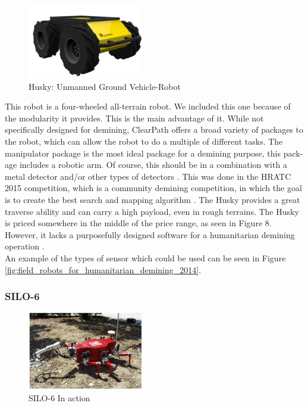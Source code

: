 \begin{figure}
    \centering
      \includegraphics[width=0.45\textwidth]{00 - Images/husky_unmanned_ground_vehicle_robot.png}
  \caption{Husky: Unmanned Ground Vehicle-Robot \cite{ClearPath2020}}
  \label{fig:husky_unmanned_ground_vehicle_robot}
\end{figure}
This robot is a four-wheeled all-terrain robot. We included this one because of the modularity it provides. This is the main advantage of it. While not specifically designed for demining, ClearPath offers a broad variety of packages to the robot, which can allow the robot to do a multiple of different tasks. The manipulator package is the most ideal package for a demining purpose, this pack-age includes a robotic arm. Of course, this should be in a combination with a metal detector and/or other types of detectors \cite{ClearPath2020}. This was done in the HRATC 2015 competition, which is a community demining competition, in which the goal is to create the best search and mapping algorithm \cite{HRATC2015}. The Husky provides a great traverse ability and can carry a high payload, even in rough terrains. The Husky is priced somewhere in the middle of the price range, as seen in Figure 8. However, it lacks a purposefully designed software for a humanitarian demining operation \cite{ClearPath2020}.\\

An example of the types of sensor which could be used can be seen in Figure \ref{fig:field_robots_for_humanitarian_demining_2014}.

\subsubsection*{SILO-6}

\begin{figure}
    \centering
      \includegraphics[width=0.45\textwidth]{00 - Images/silo_6_in_action.jpg}
  \caption{SILO-6 In action \cite{6LeggedRobot2007}}
  \label{fig:silo_6_in_action}
\end{figure}

